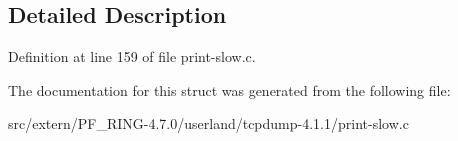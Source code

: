 \subsection{Detailed Description}


Definition at line 159 of file print-\/slow.c.



The documentation for this struct was generated from the following file:\begin{DoxyCompactItemize}
\item 
src/extern/PF\_\-RING-\/4.7.0/userland/tcpdump-\/4.1.1/print-\/slow.c\end{DoxyCompactItemize}
